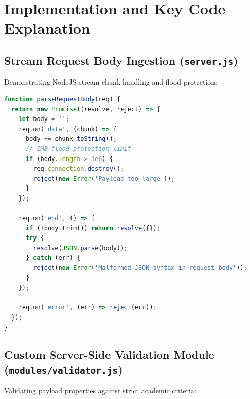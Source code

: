 \documentclass[11pt,a4paper]{article}
\begin{document}
\section{Implementation and Key Code Explanation}

\subsection{Stream Request Body Ingestion (\texttt{server.js})}
Demonstrating NodeJS stream chunk handling and flood protection:

\begin{lstlisting}[language=JavaScript, caption={Stream Request Body Parser (server.js)}]
function parseRequestBody(req) {
  return new Promise((resolve, reject) => {
    let body = '';
    req.on('data', (chunk) => {
      body += chunk.toString();
      // 1MB flood protection limit
      if (body.length > 1e6) {
        req.connection.destroy();
        reject(new Error('Payload too large'));
      }
    });

    req.on('end', () => {
      if (!body.trim()) return resolve({});
      try {
        resolve(JSON.parse(body));
      } catch (err) {
        reject(new Error('Malformed JSON syntax in request body'));
      }
    });

    req.on('error', (err) => reject(err));
  });
}
\end{lstlisting}

\subsection{Custom Server-Side Validation Module (\texttt{modules/validator.js})}
Validating payload properties against strict academic criteria:
\end{document}
